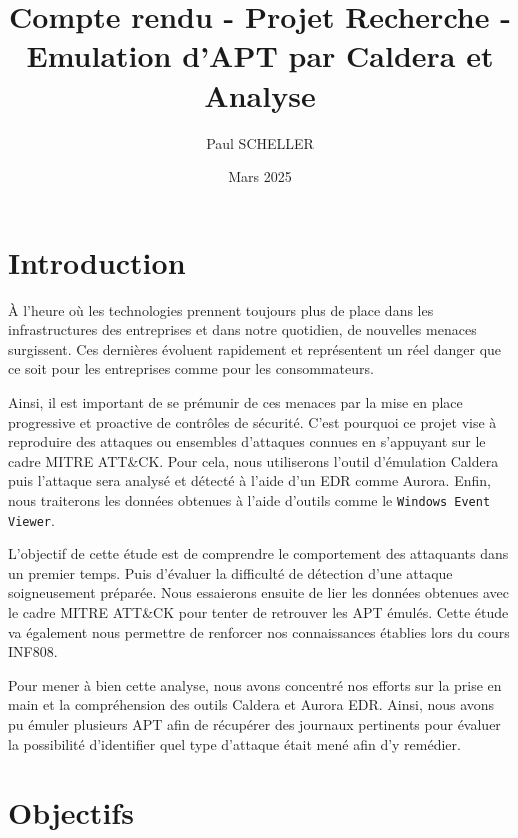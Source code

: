 \documentclass[12pt,letterpaper]{article}
\title{Compte rendu - Projet Recherche - Emulation d'APT par Caldera et Analyse}
\author{Paul SCHELLER}
\date{Mars 2025}
\begin{document}



\newpage
\renewcommand{\contentsname}{Plan de l'étude}
\tableofcontents


\newpage
\section{Introduction}

À l'heure où les technologies prennent toujours plus de place dans les infrastructures des entreprises et dans notre quotidien, de nouvelles menaces surgissent.
Ces dernières évoluent rapidement et représentent un réel danger que ce soit pour les entreprises comme pour les consommateurs.

\bigskip

Ainsi, il est important de se prémunir de ces menaces par la mise en place progressive et proactive de contrôles de sécurité.
C'est pourquoi ce projet vise à reproduire des attaques ou ensembles d'attaques connues en s'appuyant sur le cadre MITRE ATT\&CK.
Pour cela, nous utiliserons l'outil d'émulation Caldera puis l'attaque sera analysé et détecté à l'aide d'un EDR comme Aurora.
Enfin, nous traiterons les données obtenues à l'aide d'outils comme le \verb|Windows Event Viewer|.

\bigskip

L'objectif de cette étude est de comprendre le comportement des attaquants dans un premier temps.
Puis d'évaluer la difficulté de détection d'une attaque soigneusement préparée.
Nous essaierons ensuite de lier les données obtenues avec le cadre MITRE ATT\&CK pour tenter de retrouver les APT émulés.
Cette étude va également nous permettre de renforcer nos connaissances établies lors du cours INF808.

\bigskip

Pour mener à bien cette analyse, nous avons concentré nos efforts sur la prise en main et la compréhension des outils Caldera et Aurora EDR.
Ainsi, nous avons pu émuler plusieurs APT afin de récupérer des journaux pertinents pour évaluer la possibilité d'identifier quel type d'attaque était mené afin d'y remédier.

\newpage
\section{Objectifs}
\end{document}
